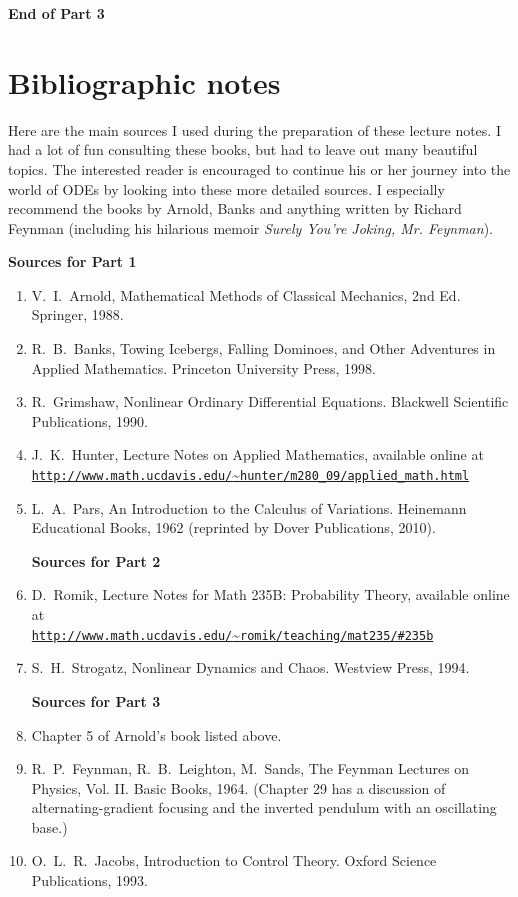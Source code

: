 \documentclass[12pt]{amsart}
\begin{document}
\vspace{10.0pt}
\begin{center}
\textbf{End of Part 3}
\end{center}

\newpage

\section*{Bibliographic notes}

Here are the main sources I used during the preparation of these lecture notes. I had a lot of fun consulting these books, but had to leave out many beautiful topics. The interested reader is encouraged to continue his or her journey into the world of ODEs by looking into these more detailed sources. I especially recommend the books by Arnold, Banks and anything written by Richard Feynman (including his hilarious memoir \textit{Surely You're Joking, Mr. Feynman}).

\bigskip

\noindent \textbf{Sources for Part 1}
\begin{enumerate}
\item V.~I.~Arnold, Mathematical Methods of Classical Mechanics, 2nd Ed. Springer, 1988.
\item R.~B.~Banks, Towing Icebergs, Falling Dominoes, and Other Adventures in Applied Mathematics. Princeton University Press, 1998.
\item R.~Grimshaw, Nonlinear Ordinary Differential Equations. Blackwell Scientific Publications, 1990.
\item J.~K.~Hunter, Lecture Notes on Applied Mathematics, available online at
\\
\href{http://www.math.ucdavis.edu/~hunter/m280_09/applied_math.html}{\texttt{http://www.math.ucdavis.edu/}\textasciitilde\texttt{hunter/m280\_09/applied\_math.html}}
\item L.~A.~Pars, An Introduction to the Calculus of Variations. Heinemann Educational Books, 1962 (reprinted by Dover Publications, 2010).

\noindent \textbf{Sources for Part 2}
\item D.~Romik, Lecture Notes for Math 235B: Probability Theory, available online at
\\ 
\href{http://www.math.ucdavis.edu/~romik/teaching/mat235-2011-2012/#235b}{\texttt{http://www.math.ucdavis.edu/}\textasciitilde\texttt{romik/teaching/mat235/\#235b}}
\item S.~H.~Strogatz, Nonlinear Dynamics and Chaos. Westview Press, 1994.

\noindent \textbf{Sources for Part 3}
\item Chapter 5 of Arnold's book listed above.
\item R.~P.~Feynman, R.~B.~Leighton, M.~Sands, The Feynman Lectures on Physics, Vol. II. Basic Books, 1964. (Chapter 29 has a discussion of alternating-gradient focusing and the inverted pendulum with an oscillating base.)
\item O.~L.~R.~Jacobs, Introduction to Control Theory. Oxford Science Publications, 1993.
\end{enumerate}
\end{document}
